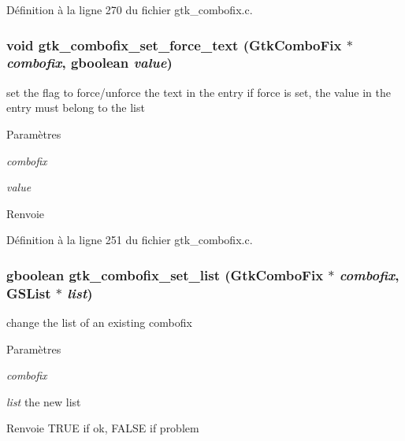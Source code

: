 Définition à la ligne 270 du fichier gtk\_\-combofix.c.

\subsubsection[{gtk\_\-combofix\_\-set\_\-force\_\-text}]{\setlength{\rightskip}{0pt plus 5cm}void gtk\_\-combofix\_\-set\_\-force\_\-text ({\bf GtkComboFix} $\ast$ {\em combofix}, \/  gboolean {\em value})}\label{gtk__combofix_8c_af698335af63e4952d8c35d912732b4e4}
set the flag to force/unforce the text in the entry if force is set, the value in the entry must belong to the list


\begin{DoxyParams}{Paramètres}
\item[{\em combofix}]\item[{\em value}]\end{DoxyParams}
\begin{DoxyReturn}{Renvoie}

\end{DoxyReturn}


Définition à la ligne 251 du fichier gtk\_\-combofix.c.

\subsubsection[{gtk\_\-combofix\_\-set\_\-list}]{\setlength{\rightskip}{0pt plus 5cm}gboolean gtk\_\-combofix\_\-set\_\-list ({\bf GtkComboFix} $\ast$ {\em combofix}, \/  GSList $\ast$ {\em list})}\label{gtk__combofix_8c_a7bfb57437f2c49510aa9eb2669dd133d}
change the list of an existing combofix


\begin{DoxyParams}{Paramètres}
\item[{\em combofix}]\item[{\em list}]the new list\end{DoxyParams}
\begin{DoxyReturn}{Renvoie}
TRUE if ok, FALSE if problem 
\end{DoxyReturn}


